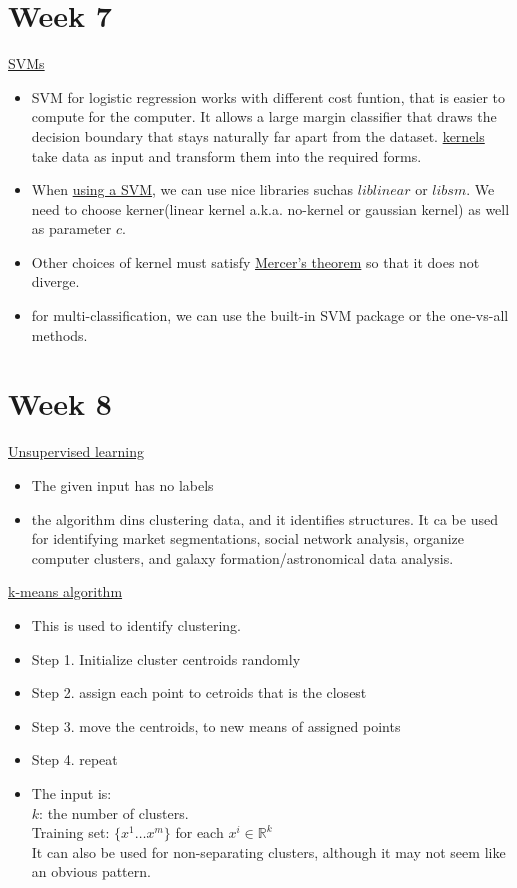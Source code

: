 \documentclass[12pt]{article}
\begin{document}
\newpage\section*{Week 7}
\underline{SVMs}
\begin{itemize}
	\item SVM for logistic regression works with different cost funtion, that is easier to compute for the computer. It allows a large margin classifier that draws the decision boundary that stays naturally far apart from the dataset. \underline{kernels} take data as input and transform them into the required forms.
	\item When \underline{using a SVM}, we can use nice libraries suchas $liblinear$ or $libsm$. We need to choose kerner(linear kernel a.k.a. no-kernel or gaussian kernel) as well as parameter $c$.
	\item Other choices of kernel must satisfy \underline{Mercer's theorem} so that it does not diverge.
	\item for multi-classification, we can use the built-in SVM package or the one-vs-all methods.
	
	\end{itemize}

\newpage\section*{Week 8}
\underline{Unsupervised learning}
\begin{itemize}
	\item The given input has no labels
	\item the algorithm dins clustering data, and it identifies structures. It ca be used for identifying market segmentations, social network analysis, organize computer clusters, and galaxy formation/astronomical data analysis.
\end{itemize}

\underline{k-means algorithm}
\begin{itemize}
	\item This is used to identify clustering.
	\item Step 1. Initialize cluster centroids randomly
	\item Step 2. assign each point to cetroids that is the closest
	\item Step 3. move the centroids, to new means of assigned points
	\item Step 4. repeat
	\item The input is:
	\\$k$: the number of clusters.
	\\Training set: $\{x^1\ldots x^m\}$ for each $x^i\in\mathbb{R}^k$
	\\It can also be used for non-separating clusters, although it may not seem like an obvious pattern.
\end{itemize}
\end{document}
